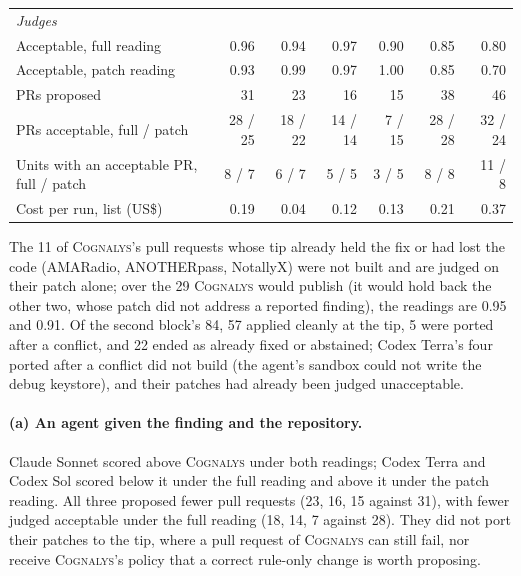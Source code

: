 \documentclass[conference]{IEEEtran}
\newcommand{\system}{\textsc{Cognalys}}
\begin{document}
\begin{table}[t]
\begin{tabular}{p{4.2cm}r|rrr|rr}
\multicolumn{7}{l}{\emph{Judges}} \\
\quad Acceptable, full reading & 0.96 & 0.94 & 0.97 & 0.90 & 0.85 & 0.80 \\
\quad Acceptable, patch reading & 0.93 & 0.99 & 0.97 & 1.00 & 0.85 & 0.70 \\
\quad PRs proposed & 31 & 23 & 16 & 15 & 38 & 46 \\
\quad PRs acceptable, full / patch & 28 / 25 & 18 / 22 & 14 / 14 & 7 / 15 & 28 / 28 & 32 / 24 \\
\quad Units with an acceptable PR, full / patch & 8 / 7 & 6 / 7 & 5 / 5 & 3 / 5 & 8 / 8 & 11 / 8 \\
Cost per run, list (US\$) & 0.19 & 0.04 & 0.12 & 0.13 & 0.21 & 0.37 \\
\bottomrule
\end{tabular}
\end{table}

The 11 of \system{}'s pull requests whose tip already held the fix or had lost
the code (AMARadio, ANOTHERpass, NotallyX) were not built and are judged on
their patch alone;
over the 29 \system{} would publish (it would hold back the other two, whose
patch did not address a reported finding), the readings are 0.95 and 0.91. Of
the second block's 84, 57 applied cleanly at the tip, 5 were ported after a
conflict, and 22 ended as already fixed or abstained; Codex Terra's four ported
after a conflict did not build (the agent's sandbox could not write the debug
keystore), and their patches had already been judged unacceptable.

\paragraph{(a) An agent given the finding and the repository.} Claude Sonnet
scored above \system{} under both readings; Codex Terra and Codex Sol scored
below it under the full reading and above it under the patch reading. All
three proposed fewer pull requests (23, 16, 15 against 31), with fewer
judged acceptable under the full reading (18, 14, 7 against 28). They did not port
their patches to the tip, where a pull request of \system{} can still fail, nor
receive \system{}'s policy that a correct rule-only change is worth proposing.
\end{document}

